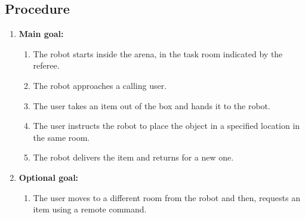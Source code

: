 \subsection*{Procedure}
\begin{enumerate}[nosep]
    \item \textbf{Main goal:}
    \begin{enumerate}[nosep]
        \item The robot starts inside the arena, in the task room indicated by the referee.
        \item The robot approaches a calling user.
        \item The user takes an item out of the box and hands it to the robot. 
        \item The user instructs the robot to place the object in a specified location in the same room.
        \item The robot delivers the item and returns for a new one.
    \end{enumerate}
    \item \textbf{Optional goal:} 
    \begin{enumerate}[nosep]
        \item The user moves to a different room from the robot and then, requests an item using a remote command.
    \end{enumerate}
\end{enumerate}


